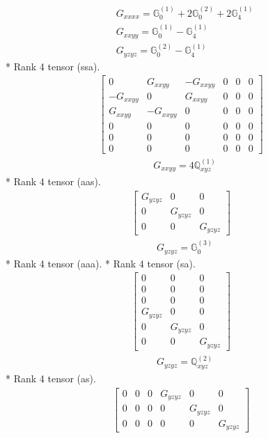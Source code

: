 \documentclass[fleqn,8pt,landscape]{jsarticle}
\begin{document}
\begin{align*}
& G_{xxxx} = \mathbb{G}_{0}^{(1)} + 2 \mathbb{G}_{0}^{(2)} + 2 \mathbb{G}_{4}^{(1)} \\
& G_{xxyy} = \mathbb{G}_{0}^{(1)} - \mathbb{G}_{4}^{(1)} \\
& G_{yzyz} = \mathbb{G}_{0}^{(2)} - \mathbb{G}_{4}^{(1)}
\end{align*}
* Rank 4 tensor (ssa).
\begin{align*}
\begin{bmatrix} 0 & G_{xxyy} & - G_{xxyy} & 0 & 0 & 0 \\ - G_{xxyy} & 0 & G_{xxyy} & 0 & 0 & 0 \\ G_{xxyy} & - G_{xxyy} & 0 & 0 & 0 & 0 \\ 0 & 0 & 0 & 0 & 0 & 0 \\ 0 & 0 & 0 & 0 & 0 & 0 \\ 0 & 0 & 0 & 0 & 0 & 0 \end{bmatrix}
\end{align*}
\begin{align*}
& G_{xxyy} = 4 \mathbb{Q}_{xyz}^{(1)}
\end{align*}
* Rank 4 tensor (aas).
\begin{align*}
\begin{bmatrix} G_{yzyz} & 0 & 0 \\ 0 & G_{yzyz} & 0 \\ 0 & 0 & G_{yzyz} \end{bmatrix}
\end{align*}
\begin{align*}
& G_{yzyz} = \mathbb{G}_{0}^{(3)}
\end{align*}
* Rank 4 tensor (aaa).
* Rank 4 tensor (sa).
\begin{align*}
\begin{bmatrix} 0 & 0 & 0 \\ 0 & 0 & 0 \\ 0 & 0 & 0 \\ G_{yzyz} & 0 & 0 \\ 0 & G_{yzyz} & 0 \\ 0 & 0 & G_{yzyz} \end{bmatrix}
\end{align*}
\begin{align*}
& G_{yzyz} = \mathbb{Q}_{xyz}^{(2)}
\end{align*}
* Rank 4 tensor (as).
\begin{align*}
\begin{bmatrix} 0 & 0 & 0 & G_{yzyz} & 0 & 0 \\ 0 & 0 & 0 & 0 & G_{yzyz} & 0 \\ 0 & 0 & 0 & 0 & 0 & G_{yzyz} \end{bmatrix}
\end{align*}
\end{document}
